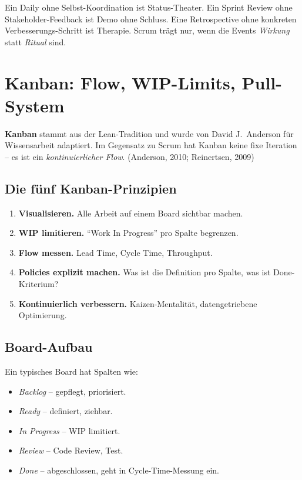\documentclass[11pt,a4paper,oneside]{article}
\newcommand{\fachbegriff}[1]{\textbf{#1}}
\newcommand{\quelle}[1]{{\footnotesize\color{lpGray}(#1)}}
\begin{document}
\begin{merkbox}
Ein Daily ohne Selbst-Koordination ist Status-Theater. Ein Sprint Review ohne Stakeholder-Feedback ist Demo ohne Schluss. Eine Retrospective ohne konkreten Verbesserungs-Schritt ist Therapie. Scrum trägt nur, wenn die Events \emph{Wirkung} statt \emph{Ritual} sind.
\end{merkbox}

\section{Kanban: Flow, WIP-Limits, Pull-System}

\fachbegriff{Kanban} stammt aus der Lean-Tradition und wurde von David J.\ Anderson für Wissensarbeit adaptiert. Im Gegensatz zu Scrum hat Kanban keine fixe Iteration -- es ist ein \emph{kontinuierlicher Flow}. \quelle{Anderson, 2010; Reinertsen, 2009}

\subsection{Die fünf Kanban-Prinzipien}

\begin{enumerate}
  \item \fachbegriff{Visualisieren.} Alle Arbeit auf einem Board sichtbar machen.
  \item \fachbegriff{WIP limitieren.} ``Work In Progress'' pro Spalte begrenzen.
  \item \fachbegriff{Flow messen.} Lead Time, Cycle Time, Throughput.
  \item \fachbegriff{Policies explizit machen.} Was ist die Definition pro Spalte, was ist Done-Kriterium?
  \item \fachbegriff{Kontinuierlich verbessern.} Kaizen-Mentalität, datengetriebene Optimierung.
\end{enumerate}

\subsection{Board-Aufbau}

Ein typisches Board hat Spalten wie:

\begin{itemize}
  \item \emph{Backlog} -- gepflegt, priorisiert.
  \item \emph{Ready} -- definiert, ziehbar.
  \item \emph{In Progress} -- WIP limitiert.
  \item \emph{Review} -- Code Review, Test.
  \item \emph{Done} -- abgeschlossen, geht in Cycle-Time-Messung ein.
\end{itemize}
\end{document}
